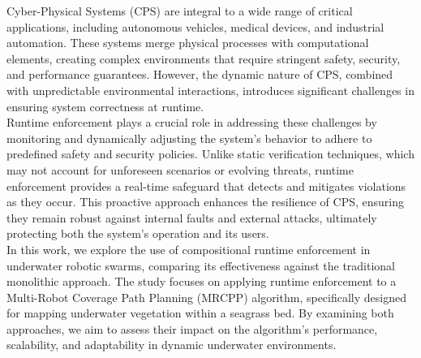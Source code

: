 Cyber-Physical Systems (CPS) are integral to a wide range of critical applications, including autonomous vehicles, medical devices, and industrial automation. These systems merge physical processes with computational elements, creating complex environments that require stringent safety, security, and performance guarantees. However, the dynamic nature of CPS, combined with unpredictable environmental interactions, introduces significant challenges in ensuring system correctness at runtime. \\

\noindent Runtime enforcement plays a crucial role in addressing these challenges by monitoring and dynamically adjusting the system's behavior to adhere to predefined safety and security policies. Unlike static verification techniques, which may not account for unforeseen scenarios or evolving threats, runtime enforcement provides a real-time safeguard that detects and mitigates violations as they occur. This proactive approach enhances the resilience of CPS, ensuring they remain robust against internal faults and external attacks, ultimately protecting both the system's operation and its users. \\

\noindent In this work, we explore the use of compositional runtime enforcement in underwater robotic swarms, comparing its effectiveness against the traditional monolithic approach. The study focuses on applying runtime enforcement to a Multi-Robot Coverage Path Planning (MRCPP) algorithm, specifically designed for mapping underwater vegetation within a seagrass bed. By examining both approaches, we aim to assess their impact on the algorithm's performance, scalability, and adaptability in dynamic underwater environments.

\newpage
